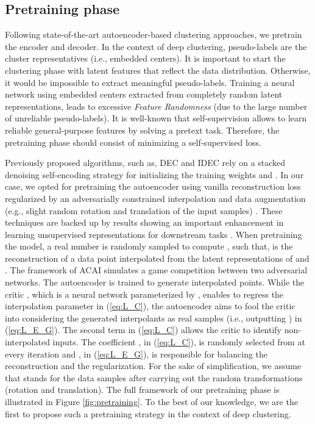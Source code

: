 \documentclass{article}
\begin{document}
\subsection{Pretraining phase}
Following state-of-the-art autoencoder-based clustering approaches, we pretrain the encoder and decoder. In the context of deep clustering, pseudo-labels are the cluster representatives (i.e., embedded centers). It is important to start the clustering phase with latent features that reflect the data distribution. Otherwise, it would be impossible to extract meaningful pseudo-labels. Training a neural network using embedded centers extracted from completely random latent representations, leads to excessive \textit{Feature Randomness} (due to the large number of unreliable pseudo-labels). It is well-known that self-supervision allows to learn reliable general-purpose features by solving a pretext task. Therefore, the pretraining phase should consist of minimizing a self-supervised loss.

Previously proposed algorithms, such as, DEC and IDEC rely on a stacked denoising self-encoding strategy \cite{paper33} for initializing the training weights  and . In our case, we opted for pretraining the autoencoder using vanilla reconstruction loss regularized by an adversarially constrained interpolation \cite{paper5} and data augmentation (e.g., slight random rotation and translation of the input samples) \cite{paper34}. These techniques are backed up by results showing an important enhancement in learning unsupervised representations for downstream tasks \cite{paper5, paper34}. When pretraining the model, a real number  is randomly sampled to compute , such that,  is the reconstruction of a data point interpolated from the latent representations of  and . The framework of ACAI \cite{paper5} simulates a game competition between two adversarial networks. The autoencoder is trained to generate interpolated points. While the critic , which is a neural network parameterized by , enables to regress the interpolation parameter  in (\ref{eq:L_C}), the autoencoder aims to fool the critic into considering the generated interpolants as real samples (i.e., outputting ) in (\ref{eq:L_E_G}). The second term in (\ref{eq:L_C}) allows the critic to identify non-interpolated inputs. The coefficient , in (\ref{eq:L_C}), is randomly selected from  at every iteration and , in (\ref{eq:L_E_G}), is responsible for balancing the reconstruction and the regularization. For the sake of simplification, we assume that  stands for the data samples after carrying out the random transformations (rotation and translation). The full framework of our pretraining phase is illustrated in Figure \ref{fig:pretraining}. To the best of our knowledge, we are the first to propose such a pretraining strategy in the context of deep clustering.
\end{document}
